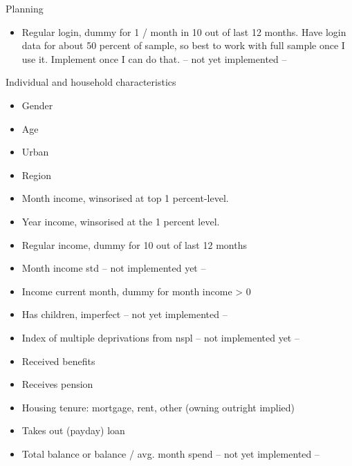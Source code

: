 Planning
\begin{itemize}
    \item Regular login, dummy for 1 / month in 10 out of last 12 months. Have
        login data for about 50 percent of sample, so best to work with full
        sample once I use it. Implement once I can do that. -- not yet
        implemented --
\end{itemize}

Individual and household characteristics
\begin{itemize}
    \item Gender

    \item Age

    \item Urban

    \item Region

    \item Month income, winsorised at top 1 percent-level.

    \item Year income, winsorised at the 1 percent level.

    \item Regular income, dummy for 10 out of last 12 months

    \item Month income std -- not implemented yet --

    \item Income current month, dummy for month income > 0

    \item Has children, imperfect -- not yet implemented --

    \item Index of multiple deprivations from nspl -- not implemented yet --

    \item Received benefits

    \item Receives pension

    \item Housing tenure: mortgage, rent, other (owning outright implied)

    \item Takes out (payday) loan

    \item Total balance or balance / avg. month spend -- not yet implemented --
\end{itemize}







